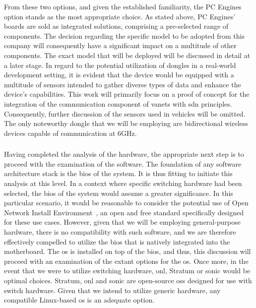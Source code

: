 From these two options, and given the established familiarity, the PC Engines option stands as the most appropriate choice. As stated above, PC Engines' boards are sold as integrated solutions, comprising a pre-selected range of components. The decision regarding the specific model to be adopted from this company will consequently have a significant impact on a multitude of other components. The exact model that will be deployed will be discussed in detail at a later stage. 
In regard to the potential utilization of dongles in a real-world development setting, it is evident that the device would be equipped with a multitude of sensors intended to gather diverse types of data and enhance the device's capabilities. This work will primarily focus on a proof of concept for the integration of the communication component of \glspl{vanet} with \gls{sdn} principles. Consequently, further discussion of the sensors used in vehicles will be omitted. The only noteworthy dongle that we will be employing are bidirectional wireless devices capable of communication at 6GHz.

\subsubsection{}
Having completed the analysis of the hardware, the appropriate next step is to proceed with the examination of the software. The foundation of any software architecture stack is the \gls{bios} of the system. It is thus fitting to initiate this analysis at this level. In a context where specific switching hardware had been selected, the \gls{bios} of the system would assume a greater significance. In this particular scenario, it would be reasonable to consider the potential use of Open Network Install Environment~\cite{noauthor_deploy_nodate}, an open and free standard specifically designed for these use cases. However, given that we will be employing general-purpose hardware, there is no compatibility with such software, and we are therefore effectively compelled to utilize the \gls{bios} that is natively integrated into the motherboard.
The \gls{os} is installed on top of the \gls{bios}, and thus, this discussion will proceed with an examination of the extant options for the \gls{os}. Once more, in the event that we were to utilize switching hardware, \gls{onl}, Stratum or \gls{sonic} would be optimal choices. Stratum, \gls{onl} and \gls{sonic} are open-source \glspl{os} designed for use with switch hardware. Given that we intend to utilize generic hardware, any compatible Linux-based \gls{os} is an adequate option.

